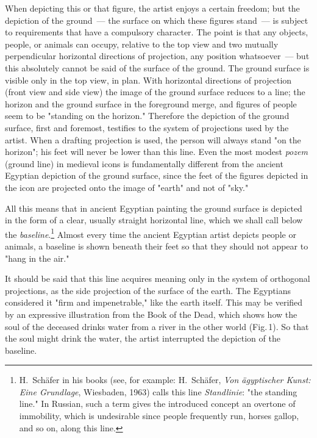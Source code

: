 When depicting this or that figure, the artist enjoys a certain freedom; but the
depiction of the ground~--- the surface on which these figures stand~--- is subject to
requirements that have a compulsory character. The point is that any objects, people, or
animals can occupy, relative to the top view and two mutually perpendicular horizontal
directions of projection, any position whatsoever~--- but this absolutely cannot be said
of the surface of the ground. The ground surface is visible only in the top view, in plan.
With horizontal directions of projection (front view and side view) the image of the
ground surface reduces to a line; the horizon and the ground surface in the foreground
merge, and figures of people seem to be "standing on the horizon." Therefore the
depiction of the ground surface, first and foremost, testifies to the system of projections
used by the artist. When a drafting projection is used, the person will always stand "on
the horizon"; his feet will never be lower than this line. Even the most modest
\textit{pozem} (ground line) in medieval icons is fundamentally different from the
ancient Egyptian depiction of the ground surface, since the feet of the figures depicted
in the icon are projected onto the image of "earth" and not of "sky."

All this means that in ancient Egyptian painting the ground surface is depicted in the
form of a clear, usually straight horizontal line, which we shall call below the
\textit{baseline}.\footnote{%
  H.~Schäfer in his books (see, for example: H.~Schäfer, \textit{Von ägyptischer Kunst:
  Eine Grundlage}, Wiesbaden, 1963) calls this line \textit{Standlinie}: "the standing
  line." In Russian, such a term gives the introduced concept an overtone of
  immobility, which is undesirable since people frequently run, horses gallop, and so
  on, along this line.}
Almost every time the ancient Egyptian artist depicts people or animals, a baseline is
shown beneath their feet so that they should not appear to "hang in the air."

It should be said that this line acquires meaning only in the system of orthogonal
projections, as the side projection of the surface of the earth. The Egyptians considered
it "firm and impenetrable," like the earth itself. This may be verified by an expressive
illustration from the Book of the Dead, which shows how the soul of the deceased
drinks water from a river in the other world (Fig.\,1). So that the soul might drink the
water, the artist interrupted the depiction of the baseline.

